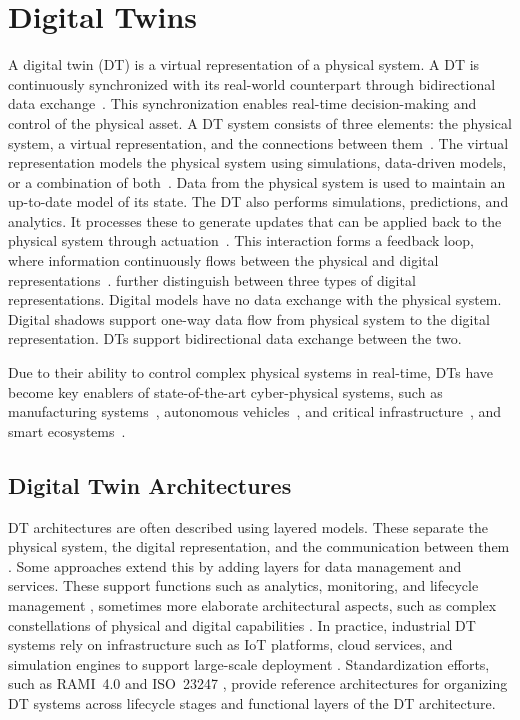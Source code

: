 \section{Digital Twins}\label{sec:background-dt}
A digital twin (DT) is a virtual representation of a physical system. A DT is continuously synchronized with its real-world counterpart through bidirectional data exchange~\cite{kritzinger2018digital}. This synchronization enables real-time decision-making and control of the physical asset. A DT system consists of three elements: the physical system, a virtual representation, and the connections between them~\cite{vanderhorn2021digital}. The virtual representation models the physical system using simulations, data-driven models, or a combination of both~\cite{negri2017review}. Data from the physical system is used to maintain an up-to-date model of its state. The DT also performs simulations, predictions, and analytics. It processes these to generate updates that can be applied back to the physical system through actuation~\cite{david2024infonomics}. This interaction forms a feedback loop, where information continuously flows between the physical and digital representations~\cite{tao2018digital}. \citet{kritzinger2018digital} further distinguish between three types of digital representations. Digital models have no data exchange with the physical system. Digital shadows support one-way data flow from physical system to the digital representation. DTs support bidirectional data exchange between the two.

Due to their ability to control complex physical systems in real-time, DTs have become key enablers of state-of-the-art cyber-physical systems, such as manufacturing systems~\cite{kritzinger2018digital}, autonomous vehicles~\cite{ramdhan2025engineering}, and critical infrastructure~\cite{liu2026introduction}, and smart ecosystems~\cite{michael2024smart}.

\subsection{Digital Twin Architectures}
DT architectures are often described using layered models. These separate the physical system, the digital representation, and the communication between them \cite{tao2018digital}. Some approaches extend this by adding layers for data management and services. These support functions such as analytics, monitoring, and lifecycle management \cite{tao2019digital}, sometimes more elaborate architectural aspects, such as complex constellations of physical and digital capabilities \cite{oakes2023digital}. In practice, industrial DT systems rely on infrastructure such as IoT platforms, cloud services, and simulation engines to support large-scale deployment \cite{redelinghuys2020six-layer}. Standardization efforts, such as RAMI~4.0 \cite{DIN91345} and ISO~23247 \cite{ISO23247-1}, provide reference architectures for organizing DT systems across lifecycle stages and functional layers of the DT architecture.


